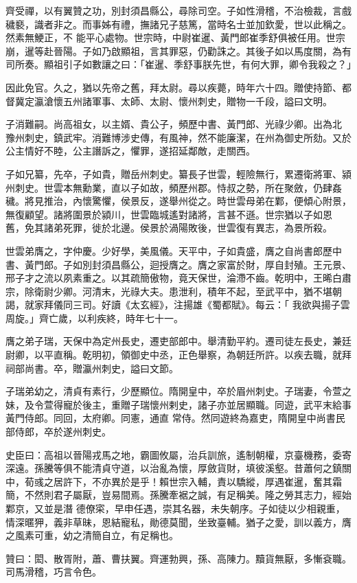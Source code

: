 \begin{pinyinscope}
 齊受禪，以有翼贊之功，別封須昌縣公，尋除司空。子如性滑稽，不治檢裁，言戲穢褻，識者非之。而事姊有禮，撫諸兄子慈篤，當時名士並加欽愛，世以此稱之。然素無鯁正，不
 能平心處物。世宗時，中尉崔暹、黃門郎崔季舒俱被任用。世宗崩，暹等赴晉陽。子如乃啟顯祖，言其罪惡，仍勸誅之。其後子如以馬度關，為有司所奏。顯祖引子如數讓之曰：「崔暹、季舒事朕先世，有何大罪，卿令我殺之？」



 因此免官。久之，猶以先帝之舊，拜太尉。尋以疾薨，時年六十四。贈使持節、都督冀定瀛滄懷五州諸軍事、太師、太尉、懷州刺史，贈物一千段，謚曰文明。



 子消難嗣。尚高祖女，以主婿、貴公子，頻歷中書、黃門郎、光祿少卿。出為北
 豫州刺史，鎮武牢。消難博涉史傳，有風神，然不能廉潔，在州為御史所劾。又於公主情好不睦，公主譖訴之，懼罪，遂招延鄰敵，走關西。



 子如兄纂，先卒，子如貴，贈岳州刺史。纂長子世雲，輕險無行，累遷衛將軍、潁州刺史。世雲本無勳業，直以子如故，頻歷州郡。恃叔之勢，所在聚斂，仍肆姦穢。將見推治，內懷驚懼，侯景反，遂舉州從之。時世雲母弟在鄴，便傾心附景，無復顧望。諸將圍景於潁川，世雲臨城遙對諸將，言甚不遜。世宗猶以子如恩
 舊，免其諸弟死罪，徙於北邊。侯景於渦陽敗後，世雲復有異志，為景所殺。



 世雲弟膺之，字仲慶。少好學，美風儀。天平中，子如貴盛，膺之自尚書郎歷中書、黃門郎。子如別封須昌縣公，迴授膺之。膺之家富於財，厚自封殖。王元景、邢子才之流以夙素重之。以其疏簡傲物，竟天保世，淪滯不齒。乾明中，王晞白肅宗，除衛尉少卿。河清末，光祿大夫。患泄利，積年不起，至武平中，猶不堪朝謁，就家拜儀同三司。好讀《太玄經》，注揚雄《蜀都賦》。每云：「
 我欲與揚子雲周旋。」齊亡歲，以利疾終，時年七十一。



 膺之弟子瑞，天保中為定州長史，遷吏部郎中。舉清勤平約。遷司徒左長史，兼廷尉卿，以平直稱。乾明初，領御史中丞，正色舉察，為朝廷所許。以疾去職，就拜祠部尚書。卒，贈瀛州刺史，謚曰文節。



 子瑞弟幼之，清貞有素行，少歷顯位。隋開皇中，卒於眉州刺史。子瑞妻，令萱之妹，及令萱得寵於後主，重贈子瑞懷州剌史，諸子亦並居顯職。同遊，武平末給事黃門侍郎。同回，太府卿。同憲，通直
 常侍。然同遊終為嘉吏，隋開皇中尚書民部侍郎，卒於遂州刺史。



 史臣曰：高祖以晉陽戎馬之地，霸圖攸屬，治兵訓旅，遙制朝權，京臺機務，委寄深遠。孫騰等俱不能清貞守道，以治亂為懷，厚斂貨財，填彼溪壑。昔蕭何之鎮關中，荀彧之居許下，不亦異於是乎！賴世宗入輔，責以驕縱，厚遇崔暹，奮其霜簡，不然則君子屬厭，豈易間焉。孫騰牽裾之誠，有足稱美。隆之勞其志力，經始鄴京，又並是潛
 德僚寀，早申任遇，崇其名器，未失朝序。子如徒以少相親重，情深暱狎，義非草昧，恩結寵私，勛德莫聞，坐致臺輔。猶子之愛，訓以義方，膺之風素可重，幼之清簡自立，有足稱也。



 贊曰：閎、散胥附，蕭、曹扶翼。齊運勃興，孫、高陳力。黷貨無厭，多慚袞職。司馬滑稽，巧言令色。



\end{pinyinscope}